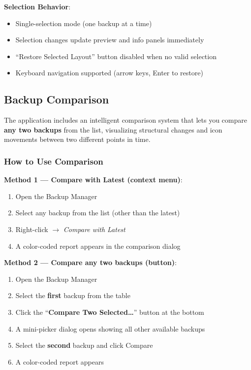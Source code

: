 \documentclass[a4paper,11pt]{article}
\begin{document}
\textbf{Selection Behavior}:
\begin{itemize}
  \item Single-selection mode (one backup at a time)
  \item Selection changes update preview and info panels immediately
  \item ``Restore Selected Layout'' button disabled when no valid selection
  \item Keyboard navigation supported (arrow keys, Enter to restore)
\end{itemize}

\subsection{Backup Comparison}

The application includes an intelligent comparison system that lets
you compare \textbf{any two backups} from the list, visualizing
structural changes and icon movements between two different points in time.

\subsubsection{How to Use Comparison}

\textbf{Method 1 --- Compare with Latest (context menu)}:
\begin{enumerate}
  \item Open the Backup Manager
  \item Select any backup from the list (other than the latest)
  \item Right-click $\rightarrow$ \textit{Compare with Latest}
  \item A color-coded report appears in the comparison dialog
\end{enumerate}

\textbf{Method 2 --- Compare any two backups (button)}:
\begin{enumerate}
  \item Open the Backup Manager
  \item Select the \textbf{first} backup from the table
  \item Click the ``\textbf{Compare Two Selected\ldots}'' button at the bottom
  \item A mini-picker dialog opens showing all other available backups
  \item Select the \textbf{second} backup and click Compare
  \item A color-coded report appears
\end{enumerate}
\end{document}
